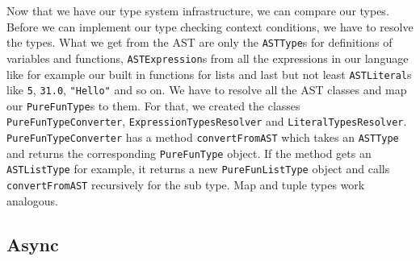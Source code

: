 Now that we have our type system infrastructure, we can compare our types. Before we can implement our type checking context conditions, we have to resolve the types. What we get from the AST are only the \lstinline{ASTType}{}s for definitions of variables and functions, \lstinline{ASTExpression}{}s from all the expressions in our language like for example our built in functions for lists and last but not least \lstinline{ASTLiteral}{}s like \lstinline{5}{}, \lstinline{31.0}{}, \lstinline{"Hello"}{} and so on. We have to resolve all the AST classes and map our \lstinline{PureFunType}{}s to them. For that, we created the classes \lstinline{PureFunTypeConverter}{}, \lstinline{ExpressionTypesResolver}{} and \lstinline{LiteralTypesResolver}{}.\\
\lstinline{PureFunTypeConverter}{} has a method \lstinline{convertFromAST}{} which takes an \lstinline{ASTType}{} and returns the corresponding \lstinline{PureFunType}{} object. If the method gets an \lstinline{ASTListType}{} for example, it returns a new \lstinline{PureFunListType}{} object and calls \lstinline{convertFromAST}{} recursively for the sub type. Map and tuple types work analogous.

\subsection{Async}

